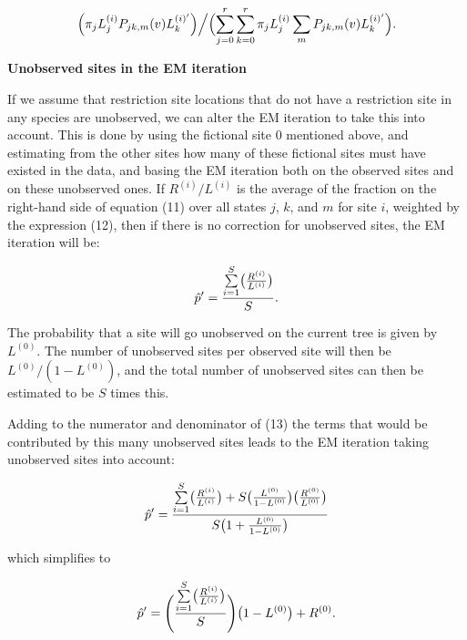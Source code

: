\begin{equation} %
       {\Bigl(\pi_j L_j^{(i)} P_{jk,m}(v) L_k^{(i)'}}\Bigl) \Bigl/
       {\Bigl(\sum_{j=0}^r \sum_{k=0}^r \pi_j L_j^{(i)} \sum_m P_{jk,m}(v) L_k^{(i)'}}\Bigl).
\end{equation}

\bigskip

\centerline{\bf Unobserved sites in the EM iteration}

If we assume that restriction site locations that do not have a restriction
site in any species are unobserved, we can alter the EM iteration to take this
into account.  This is done by using the fictional site 0 mentioned above,
and estimating from the other sites how many of these fictional sites must have
existed in the data, and basing the EM iteration both on the observed sites and
on these unobserved ones.   If $R^{(i)}/L^{(i)}$ is the average of the fraction on the right-hand side of
equation (11) over all states $j$, $k$, and $m$ for site $i$, weighted by
the expression (12), then if there is
no correction for unobserved sites, the EM iteration will be:

\begin{equation} %
{\hat p}' = {{\sum\limits_{i=1}^S \bigl({{R^{(i)}} \over {L^{(i)}}}\bigr)} \over {S}}.
\end{equation}


The probability that a site will go unobserved on the current tree is given by
$L^{(0)}$.  The number of unobserved sites per observed site will then be
$L^{(0)}/(1-L^{(0)})$, and the total number of unobserved sites can then be
estimated to be $S$ times this.

Adding to the numerator and denominator of (13) the terms that would be
contributed by this many unobserved sites leads to the EM iteration taking unobserved sites into account:

\begin{equation} %
        {\hat p}' = {{\sum\limits_{i=1}^S \bigl({{R^{(i)}} \over {L^{(i)}}}\bigr) +
   S \bigl({{L^{(0)}} \over {1-L^{(0)}}}\bigr) \bigl({{R^{(0)}} \over {L^{(0)}}}\bigr) 
} \over {S \bigl(1 + {{L^{(0)}} \over {1-L^{(0)}}}\bigr)}}
\end{equation}

which simplifies to

\begin{equation} %
        {\hat p}' = \Biggl({{\sum\limits_{i=1}^S \bigl({{R^{(i)}} \over {L^{(i)}}}\bigr)} \over {S}}\Biggr) \bigl(1-L^{(0)}\bigr) + R^{(0)}.
\end{equation}

